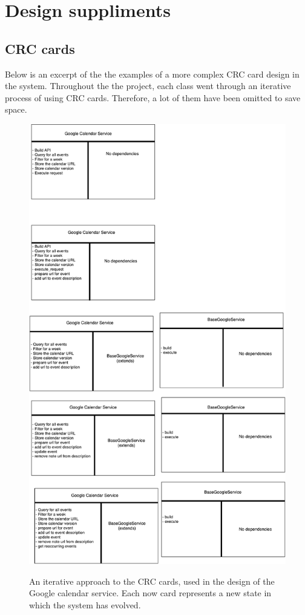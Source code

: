 \chapter{Design suppliments}

\section{CRC cards}
Below is an excerpt of the the examples of a more complex CRC card design in the system. Throughout the the project, each class went through an iterative process of using CRC cards. Therefore, a lot of them have been omitted to save space.

\begin{figure}[H]
  \centering
  \includegraphics{images/google_calendar_service.pdf}
  \label{fig:crc_card_google_calendar}
  \caption{An iterative approach to the CRC cards, used in the design of the Google calendar service. Each now card represents a new state in which the system has evolved.}
\end{figure}

